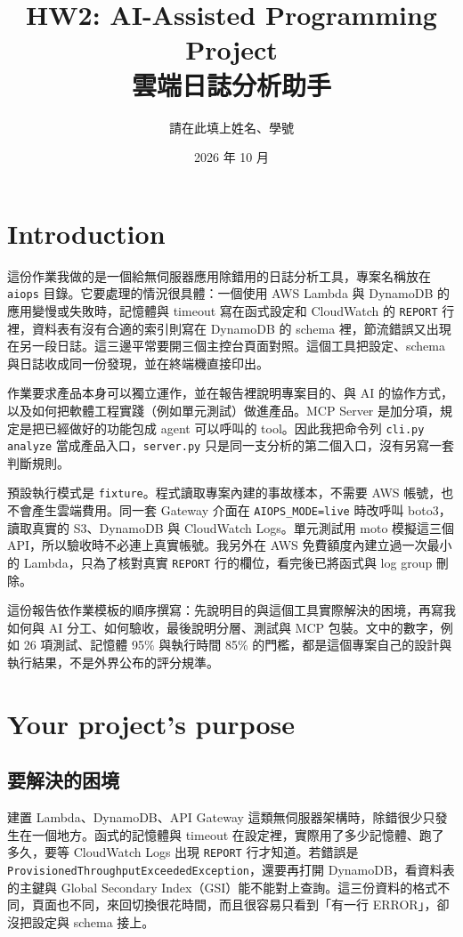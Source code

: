 \documentclass[11pt]{article}
\title{HW2: AI-Assisted Programming Project\\雲端日誌分析助手}
\author{請在此填上姓名、學號}
\date{2026 年 10 月}
\begin{document}
\maketitle

\section{Introduction}

這份作業我做的是一個給無伺服器應用除錯用的日誌分析工具，專案名稱放在 \texttt{aiops} 目錄。它要處理的情況很具體：一個使用 AWS Lambda 與 DynamoDB 的應用變慢或失敗時，記憶體與 timeout 寫在函式設定和 CloudWatch 的 \texttt{REPORT} 行裡，資料表有沒有合適的索引則寫在 DynamoDB 的 schema 裡，節流錯誤又出現在另一段日誌。這三邊平常要開三個主控台頁面對照。這個工具把設定、schema 與日誌收成同一份發現，並在終端機直接印出。

作業要求產品本身可以獨立運作，並在報告裡說明專案目的、與 AI 的協作方式，以及如何把軟體工程實踐（例如單元測試）做進產品。MCP Server 是加分項，規定是把已經做好的功能包成 agent 可以呼叫的 tool。因此我把命令列 \texttt{cli.py analyze} 當成產品入口，\texttt{server.py} 只是同一支分析的第二個入口，沒有另寫一套判斷規則。

預設執行模式是 \texttt{fixture}。程式讀取專案內建的事故樣本，不需要 AWS 帳號，也不會產生雲端費用。同一套 Gateway 介面在 \texttt{AIOPS\_MODE=live} 時改呼叫 boto3，讀取真實的 S3、DynamoDB 與 CloudWatch Logs。單元測試用 moto 模擬這三個 API，所以驗收時不必連上真實帳號。我另外在 AWS 免費額度內建立過一次最小的 Lambda，只為了核對真實 \texttt{REPORT} 行的欄位，看完後已將函式與 log group 刪除。

這份報告依作業模板的順序撰寫：先說明目的與這個工具實際解決的困境，再寫我如何與 AI 分工、如何驗收，最後說明分層、測試與 MCP 包裝。文中的數字，例如 26 項測試、記憶體 95\% 與執行時間 85\% 的門檻，都是這個專案自己的設計與執行結果，不是外界公布的評分規準。

\section{Your project's purpose}

\subsection{要解決的困境}

建置 Lambda、DynamoDB、API Gateway 這類無伺服器架構時，除錯很少只發生在一個地方。函式的記憶體與 timeout 在設定裡，實際用了多少記憶體、跑了多久，要等 CloudWatch Logs 出現 \texttt{REPORT} 行才知道。若錯誤是 \texttt{ProvisionedThroughputExceededException}，還要再打開 DynamoDB，看資料表的主鍵與 Global Secondary Index（GSI）能不能對上查詢。這三份資料的格式不同，頁面也不同，來回切換很花時間，而且很容易只看到「有一行 ERROR」，卻沒把設定與 schema 接上。
\end{document}
